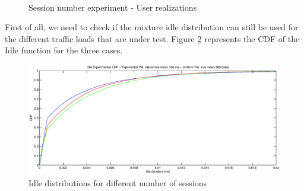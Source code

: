 \begin{figure}[t]
{	}\\
	\caption{Session number experiment - User realizations}
	\label{fig:user_realizations_final}
\end{figure}

First of all, we need to check if the mixture idle distribution can still be used for the different traffic loads that are under test. Figure \ref{fig:sessions_composed_cdf} represents the \acs{CDF} of the Idle function for the three cases.

\begin{figure}[t]
	\centering
	\includegraphics[scale=0.35, trim = 0mm 0mm 6mm 180mm, clip]{images/results/GlobalView/sessions/sessions_composed_cdf}
	\caption{Idle distributions for different number of sessions}
	\label{fig:sessions_composed_cdf}
\end{figure}

